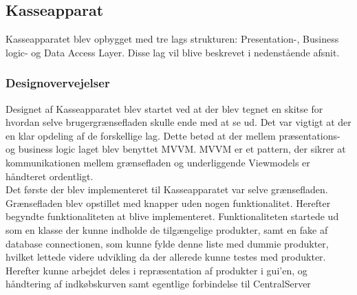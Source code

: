 \subsection{Kasseapparat}

Kasseapparatet blev opbygget med tre lags strukturen: Presentation-, Business logic- og Data Access Layer. Disse lag vil blive beskrevet i nedenstående afsnit.

\subsubsection{Designovervejelser}
Designet af Kasseapparatet blev startet ved at der blev tegnet en skitse for hvordan selve brugergrænsefladen skulle ende med at se ud.
Det var vigtigt at der en klar opdeling af de forskellige lag. Dette betød at der mellem præsentations- og business logic laget blev benyttet MVVM. MVVM er et pattern, der sikrer at kommunikationen mellem grænsefladen og underliggende Viewmodels er håndteret ordentligt. \\
Det første der blev implementeret til Kasseapparatet var selve grænsefladen. Grænsefladen blev opstillet med knapper uden nogen funktionalitet. Herefter begyndte funktionaliteten at blive implementeret. Funktionaliteten startede ud som en klasse der kunne indholde de tilgængelige produkter, samt en fake af database connectionen, som kunne fylde denne liste med dummie produkter, hvilket lettede videre udvikling da der allerede kunne testes med produkter. Herefter kunne arbejdet deles i repræsentation af produkter i gui'en, og håndtering af indkøbskurven samt egentlige forbindelse til CentralServer





